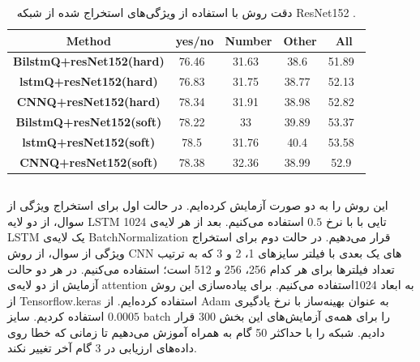 {{\begin{table}[H]
\begin{latin}
\begin{small}
\begin{tabular}{ c|| c c c c }
						\textbf{Method} & \textbf{yes/no} & \textbf{Number} & \textbf{Other} & \textbf{All} \\ \midrule
						\textbf{BilstmQ+resNet152(hard)} & 76.46\ & 31.63\ & 38.6\ & 51.89\ \\
						\textbf{lstmQ+resNet152(hard)} & 76.83\ & 31.75\ & 38.77\ & 52.13\ \\ 
						\textbf{CNNQ+resNet152(hard)} & 78.34\ & 31.91\ & 38.98\ & 52.82\ \\
						\textbf{BilstmQ+resNet152(soft)} & 78.22\ & 33\ & 39.89\ & 53.37\ \\
						\textbf{lstmQ+resNet152(soft)} & 78.5\ & 31.76\ & 40.4\ & 53.58\ \\ 
						\textbf{CNNQ+resNet152(soft)} & 78.38\ & 32.36\ & 38.99\ & 52.9\ \\
						\bottomrule
					\end{tabular}
				\end{small}
			\end{latin}
			\caption{دقت  روش  با استفاده از ویژگی‌های استخراج شده از شبکه ResNet152 .}
			\label{tabel:6}
		\end{table}
	
	}
	\subsection{}
	{
		این روش را به دو صورت آزمایش کرده‌ایم. در حالت اول برای استخراج ویژگی از سوال، از دو لایه LSTM 1024 تایی با
		   با نرخ $0.5$ استفاده می‌کنیم. بعد از هر لایه‌ی LSTM‌ یک لایه‌ی BatchNormalization‌ قرار می‌دهیم. در حالت دوم برای استخراج ویژگی از سوال، از روش CNN های یک بعدی با فیلتر سایز‌های 1، 2 و 3 که به ترتیب تعداد فیلتر‌ها برای هر کدام 256، 256 و 512 است؛ استفاده می‌کنیم. در هر دو حالت آزمایش از دو لایه‌ی attention به ابعاد 1024‌‌استفاده می‌کنیم. برای پیاده‌سازی این روش از Tensorflow.keras استفاده کرده‌ایم. از Adam به عنوان بهینه‌ساز با نرخ یادگیری $0.0005$ استفاده کردیم. سایز batch‌ را برای همه‌ی آزمایش‌های این بخش 300 قرار دادیم. شبکه را با حداکثر 50‌ گام به همراه 
		   آموزش می‌دهیم تا زمانی که خطا روی داده‌های ارزیابی در 3 گام آخر تغییر نکند.
		   
}}

